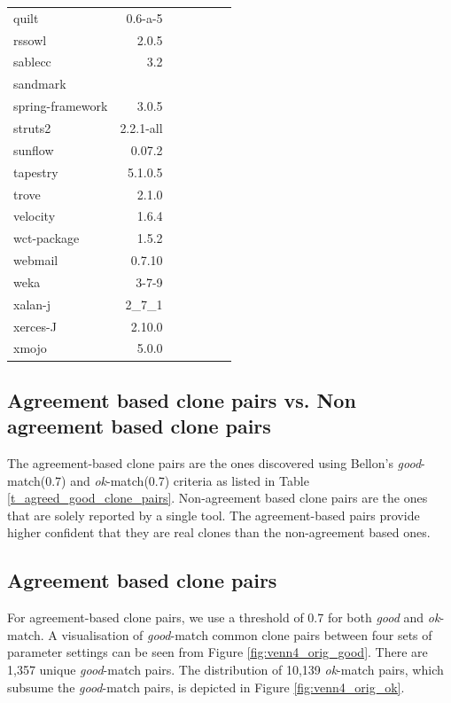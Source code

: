 \documentclass{sig-alternate-05-2015}
\begin{document}
\begin{table}
\begin{tabular}{l|r|r|c|c|p{3cm}|p{3cm}}
			quilt & 0.6-a-5 & & & & & \\
			rssowl & 2.0.5 & & & & & \\
			sablecc & 3.2 & & & & & \\
			sandmark & & & & & & \\
			spring-framework & 3.0.5 & & & & & \\
			struts2 & 2.2.1-all & & & & & \\
			sunflow & 0.07.2 & & & & & \\
			tapestry & 5.1.0.5 & & & & & \\
			trove & 2.1.0 & & & & & \\
			velocity & 1.6.4 & & & & & \\
			wct-package & 1.5.2 & & & & & \\
			webmail & 0.7.10 & & & & & \\
			weka & 3-7-9 & & & & & \\
			xalan-j & 2\_7\_1 & & & & & \\
			xerces-J & 2.10.0 & & & & & \\
			xmojo & 5.0.0 & & & & & \\
			\hline 
		\end{tabular} %
\end{table}

\subsection{Agreement based clone pairs vs. Non agreement based clone pairs}

The agreement-based clone pairs are the ones discovered using Bellon's \textit{good}-match(0.7) and \textit{ok}-match(0.7) criteria as listed in  Table \ref{t_agreed_good_clone_pairs}. Non-agreement based clone pairs are the ones that are solely reported by a single tool. The agreement-based pairs provide higher confident that they are real clones than the non-agreement based ones.

\subsection{Agreement based clone pairs}
For agreement-based clone pairs, we use a threshold of 0.7 for both \textit{good} and \textit{ok}-match. A visualisation of \textit{good}-match common clone pairs between four sets of parameter settings can be seen from Figure \ref{fig:venn4_orig_good}. There are 1,357 unique \textit{good}-match pairs. The distribution of 10,139 \textit{ok}-match pairs, which subsume the \textit{good}-match pairs, is depicted in Figure \ref{fig:venn4_orig_ok}.
\end{document}
